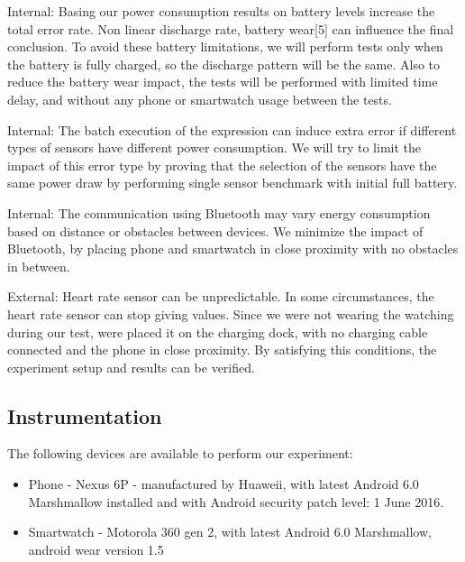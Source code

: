 Internal: Basing our power consumption  results on battery levels increase the total error rate. Non linear discharge rate,
battery wear[5] can influence the final conclusion. To avoid these battery limitations, we will perform tests only when the battery is fully charged, 
so the discharge pattern will be the same. Also to reduce the battery wear impact, the tests will be performed with limited time delay,
and without any phone or smartwatch usage between the tests.

 Internal: The batch execution of the expression can induce extra error if different types of sensors have different power consumption. 
 We will try to limit the impact of this error type by proving that the selection of the sensors have the same power draw by
 performing single sensor benchmark with initial full battery. 
 
 Internal: The communication using Bluetooth may vary energy consumption based on distance or obstacles between devices.
 We minimize the impact of Bluetooth, by placing phone and smartwatch in close proximity with no obstacles in between.
 
 External: Heart rate sensor can be unpredictable. In some circumstances, the heart rate sensor can stop giving values. 
 Since we were not wearing the watching during our test, were placed it on the charging dock, with no charging cable connected and the phone
 in close proximity. By satisfying this conditions, the experiment setup and results can be verified.
 
 \subsection{Instrumentation}
 The following devices are available to perform our experiment:
 \begin{itemize}
  \item Phone - Nexus 6P - manufactured by Huaweii,  with latest Android 6.0 Marshmallow installed and with Android security patch level: 1 June 2016. 
  \item Smartwatch - Motorola 360 gen 2, with latest Android 6.0 Marshmallow, android wear version 1.5 
 \end{itemize}

